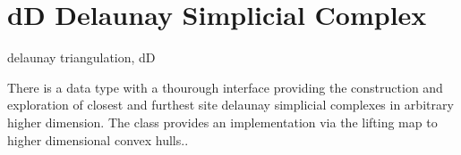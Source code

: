 \section{dD Delaunay Simplicial Complex}
\begin{ccPackage}{delaunay triangulation, dD}
  
  There is a data type with a thourough interface providing the
  construction and exploration of closest and furthest site delaunay
  simplicial complexes in arbitrary higher dimension.  The class
   provides an
  implementation via the lifting map to higher dimensional
  convex hulls..


\end{ccPackage}

